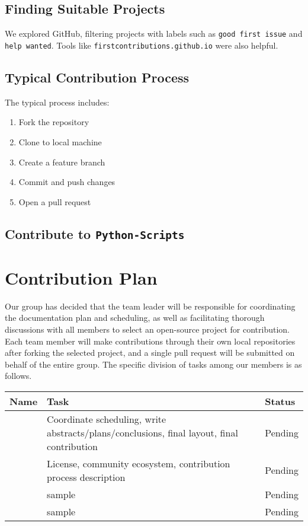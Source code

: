 \documentclass[12pt]{article}
\begin{document}
\subsection{Finding Suitable Projects}
We explored GitHub, filtering projects with labels such as \texttt{good first issue} and \texttt{help wanted}. Tools like \texttt{firstcontributions.github.io} were also helpful.

\subsection{Typical Contribution Process}
The typical process includes:
\begin{enumerate}
    \item Fork the repository
    \item Clone to local machine
    \item Create a feature branch
    \item Commit and push changes
    \item Open a pull request
\end{enumerate}

\subsection{Contribute to \texttt{Python-Scripts}}


\section{Contribution Plan}

Our group has decided that the team leader will be responsible for coordinating the documentation plan and scheduling, as well as facilitating thorough discussions with all members to select an open-source project for contribution. Each team member will make contributions through their own local repositories after forking the selected project, and a single pull request will be submitted on behalf of the entire group. The specific division of tasks among our members is as follows.

\begin{longtable}{|p{3cm}|p{7cm}|p{3cm}|}
\hline
\textbf{Name} & \textbf{Task} & \textbf{Status} \\
\hline
 & Coordinate scheduling, write abstracts/plans/conclusions, final layout, final contribution & Pending \\
\hline
 & License, community ecosystem, contribution process description & Pending \\
\hline
 & sample & Pending \\
\hline
 & sample & Pending \\
\hline
\end{longtable}
\end{document}
